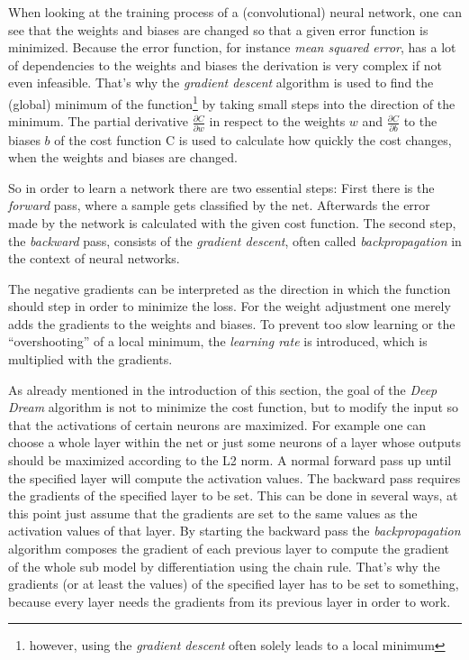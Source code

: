 When looking at the training process of a (convolutional) neural network, one can see that the weights and biases are changed so that a given error function is minimized.
Because the error function, for instance \emph{mean squared error}, has a lot of dependencies to the weights and biases the derivation is very complex if not even infeasible.
That's why the \emph{gradient descent} algorithm is used to find the (global) minimum of the function\footnote{however, using the \textit{gradient descent} often solely leads to a local minimum} by taking small steps into the direction of the minimum.
The partial derivative $\frac{\partial C}{\partial w}$ in respect to the weights $w$ and $\frac{\partial C}{\partial b}$ to the biases $b$ of the cost function C is used to calculate how quickly the cost changes, when the weights and biases are changed.

So in order to learn a network there are two essential steps:
First there is the \emph{forward} pass, where a sample gets classified by the net.
Afterwards the error made by the network is calculated with the given cost function.
The second step, the \emph{backward} pass, consists  of the \emph{gradient descent}, often called \emph{backpropagation} in the context of neural networks.

The negative gradients can be interpreted as the direction in which the function should step in order to minimize the loss.
For the weight adjustment one merely adds the gradients to the weights and biases.
To prevent too slow learning or the \enquote{overshooting} of a local minimum, the \emph{learning rate} is introduced, which is multiplied with the gradients.\cite{Fausett:1994:FNN:197023}

As already mentioned in the introduction of this section, the goal of the \emph{Deep Dream} algorithm is not to minimize the cost function, but to modify the input so that the activations of certain neurons are maximized.
For example one can choose a whole layer within the net or just some neurons of a layer whose outputs should be maximized according to the L2 norm.
A normal forward pass up until the specified layer will compute the activation values.
The backward pass requires the gradients of the specified layer to be set.
This can be done in several ways, at this point just assume that the gradients are set to the same values as the activation values of that layer.
By starting the backward pass the \textit{backpropagation} algorithm composes the gradient of each previous layer to compute the gradient of the whole sub model by differentiation using the chain rule.\cite{caffe-backward}
That's why the gradients (or at least the values) of the specified layer has to be set to something, because every layer needs the gradients from its previous layer in order to work.


